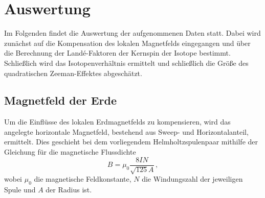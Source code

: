 \section{Auswertung}
\label{sec:Auswertung}

Im Folgenden findet die Auswertung der aufgenommenen Daten statt.
Dabei wird zunächst auf die Kompensation des lokalen Magnetfelds eingegangen
und über die Berechnung der Landé-Faktoren der Kernspin der Isotope bestimmt.
Schließlich wird das Isotopenverhältnis ermittelt
und schließlich die Größe des quadratischen Zeeman-Effektes abgeschätzt. 

\subsection{Magnetfeld der Erde}
\label{sec:Magnetfeld}

Um die Einflüsse des lokalen Erdmagnetfelds zu kompensieren,
wird das angelegte horizontale Magnetfeld,
bestehend aus Sweep- und Horizontalanteil, ermittelt.
Dies geschieht bei dem vorliegendem Helmholtzspulenpaar 
mithilfe der Gleichung für die magnetische Flussdichte
\begin{equation} \label{eq:helmholtz}
    B=\mu_0 \frac{8 I N}{\sqrt{125} A} \, ,
\end{equation}
wobei $\mu_0$ die magnetische Feldkonstante, $N$ die Windungszahl der jeweiligen Spule und $A$ der Radius ist.

